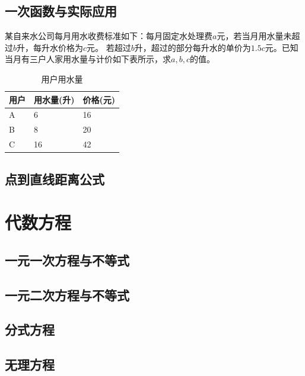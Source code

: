 \documentclass{ecnuthesis}
\begin{document}
\section{一次函数与实际应用}
\begin{problem}
某自来水公司每月用水收费标准如下：每月固定水处理费$a$元，若当月用水量未超过$b$升，每升水价格为$c$元。
若超过$b$升，超过的部分每升水的单价为$1.5c$元。已知当月有三户人家用水量与计价如下表所示，求$a,b,c$的值。
\end{problem}
\begin{table}[ht]
\centering
\caption{用户用水量}
\begin{tabular}{|l|l|l|}
\hline
用户 & 用水量(升) & 价格(元) \\
\hline
A & 6 & 16 \\
\hline
B & 8 & 20 \\
\hline
C & 16 & 42 \\
\hline
\end{tabular}
\end{table}
\clearpage
\section{点到直线距离公式}
\clearpage
\chapter{代数方程}
\section{一元一次方程与不等式}
\clearpage
\section{一元二次方程与不等式}
\clearpage
\section{分式方程}
\clearpage
\section{无理方程}
\clearpage
\end{document}
